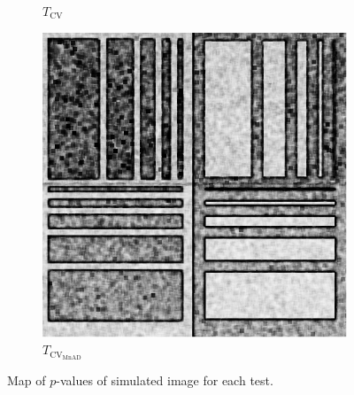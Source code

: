 \begin{figure}[H]
\begin{subfigure}[b]{0.3\textwidth}
    \caption{$T_\text{CV}$}
    \label{fig:sim_SAR_Images-2}
  \end{subfigure}
  \hfill
  \begin{subfigure}[b]{0.3\textwidth}
    \centering
    \includegraphics[width=\textwidth]{../../Figures/PNG/mnad_p_values_Phantom_mnad_7_z1}
     \caption{$T_{\text{CV}_{\text{MnAD}}}$}
    \label{fig:sim_SAR_Images-3}
  \end{subfigure}
  \caption{Map of $p$-values of simulated image for each test. }
  \label{fig:sim_SAR_Images}
\end{figure}



